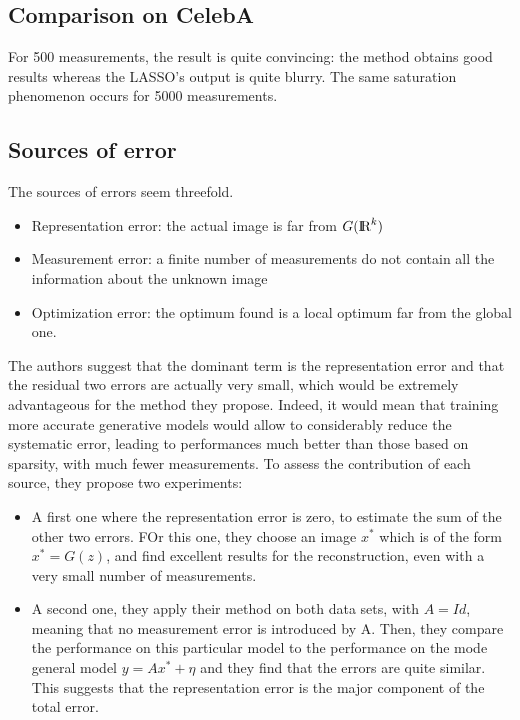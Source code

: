 \documentclass{article}
\def\R{\textrm{I\kern-0.21emR}}
\theoremstyle{definition}
\theoremstyle{lemma}
\theoremstyle{theorem}
\begin{document}
\subsection{Comparison on CelebA}
For 500 measurements, the result is quite convincing: the method obtains good results whereas the LASSO's output is quite blurry. The same saturation phenomenon occurs for 5000 measurements.

\subsection{Sources of error}
The sources of errors seem threefold.
\begin{itemize}
    \item Representation error: the actual image is far from $G(\R^k)$
    \item Measurement error: a finite number of measurements do not contain all the information about the unknown image
    \item Optimization error: the optimum found is a local optimum far from the global one.
\end{itemize}

The authors suggest that the dominant term is the representation error and that the residual two errors are actually very small, which would be extremely advantageous for the method they propose. Indeed, it would mean that training more accurate generative models would allow to considerably reduce the systematic error, leading to performances much better than those based on sparsity, with much fewer measurements.
To assess the contribution of each source, they propose two experiments:
\begin{itemize}
    \item A first one where the representation error is zero, to estimate the sum of the other two errors. FOr this one, they choose an image $x^*$ which is of the form $x^* = G(z)$, and find excellent results for the reconstruction, even with a very small number of measurements.
    \item A second one, they apply their method on both data sets, with $A = Id$, meaning that no measurement error is introduced by A. Then, they compare the performance on this particular model to the performance on the mode general model $y = Ax^* + \eta$ and they find that the errors are quite similar. This suggests that the representation error is the major component of the total error.
\end{itemize}
\end{document}
